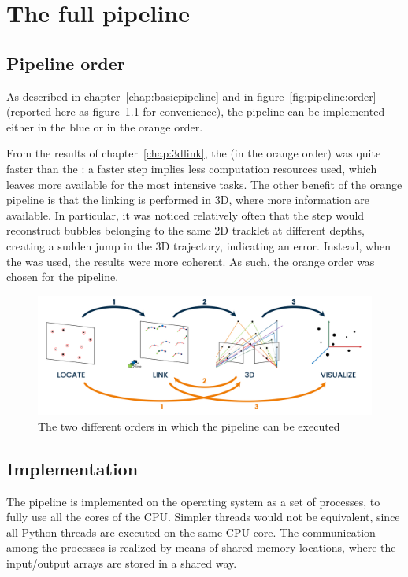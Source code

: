 \chapter{The full pipeline}
\label{chap:pipeline}

\section{Pipeline order}

As described in chapter~\ref{chap:basicpipeline} and in figure~\ref{fig:pipeline:order} (reported here as figure~\ref{fig:pipeline:order-again} for convenience), the pipeline can be implemented either in the blue or in the orange order.

From the results of chapter~\ref{chap:3dlink}, the \linkDDD* (in the orange order) was quite faster than the \linkDD*: a faster step implies less computation resources used, which leaves more available for the most intensive tasks.
The other benefit of the orange pipeline is that the linking is performed in 3D, where more information are available.
In particular, it was noticed relatively often that the \match* step would reconstruct bubbles belonging to the same 2D tracklet at different depths, creating a sudden jump in the 3D trajectory, indicating an error.
Instead, when the \linkDDD* was used, the results were more coherent.
As such, the orange order was chosen for the pipeline.

\begin{figure}
	\centerline{\includegraphics[width=\textwidth]{images/pipeline-orders.png}}
	\caption{\centering The two different orders in which the pipeline can be executed}
	\label{fig:pipeline:order-again}
\end{figure}

\section{Implementation}

The pipeline is implemented on the operating system as a set of processes, to fully use all the cores of the CPU.
Simpler threads would not be equivalent, since all Python threads are executed on the same CPU core.
The communication among the processes is realized by means of shared memory locations, where the input/output arrays are stored in a shared way.

